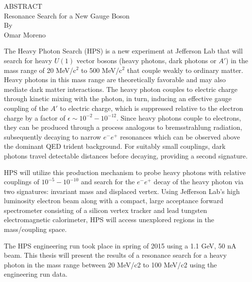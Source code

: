 %
%
%
%
\begin{center}
    ABSTRACT                                \\
    Resonance Search for a New Gauge Boson  \\
    By                                      \\
    Omar Moreno                             \\
\end{center}

The Heavy Photon Search (HPS) is a new experiment at Jefferson Lab that will 
search for heavy $U(1)$ vector bosons (heavy photons, dark photons or $A'$)
in the mass range of 20 MeV/c$^{2}$ to 500 MeV/c$^{2}$ that couple weakly to
ordinary matter.  Heavy photons in this mass range are theoretically favorable
and may also mediate dark matter interactions.  The heavy photon couples to 
electric charge through kinetic mixing with the photon, in turn, inducing an 
effective gauge coupling of the $A'$ to electric charge, which is suppressed
relative to the electron charge by a factor of 
$\epsilon \sim 10^{-2} - 10^{-12}$.  Since heavy photons couple to electrons, 
they can be produced through a process analogous to bremsstrahlung radiation, 
subsequently decaying to narrow $e^{-}e^{+}$ resonances which can be observed 
above the dominant QED trident background.  For suitably small couplings, dark
photons travel detectable distances before decaying, providing a second 
signature.

HPS will utilize this production mechanism to probe heavy photons with relative
couplings of $10^{-5} - 10^{-10}$ and search for the $e^{-}e^{+}$ decay of the
heavy photon via two signatures: invariant mass and displaced vertex.  Using 
Jefferson Lab’s high luminosity electron beam along with a compact, large 
acceptance forward spectrometer consisting of a silicon vertex tracker and lead
tungsten electromagnetic calorimeter, HPS will access unexplored regions in the
mass/coupling space. 

The HPS engineering run took place in spring of 2015 using a 1.1 GeV, 50 nA 
beam.  This thesis will present the results of a resonance search for a heavy
photon in the mass range between 20 MeV/c2 to 100 MeV/c2 using the engineering
run data. 
